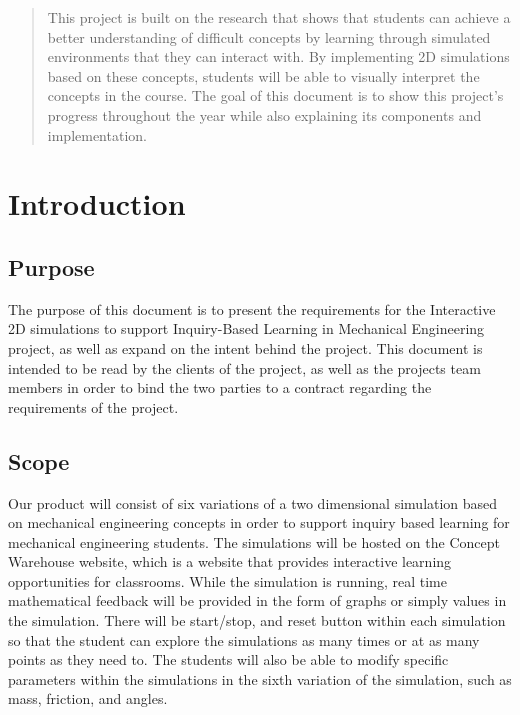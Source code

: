 \begin{titlepage}
\begin{singlespace}
\begin{abstract}
This project is built on the research that shows that students can achieve a better understanding of difficult concepts by learning through simulated environments that they can interact with.
By implementing 2D simulations based on these concepts, students will be able to visually interpret the concepts in the course.
The goal of this document is to show this project's progress throughout the year while also explaining its components and implementation.  
        \end{abstract}     
    \end{singlespace}
\end{titlepage}
\newpage
{}

\clearpage

\section{Introduction}
\subsection{Purpose}
The purpose of this document is to present the requirements for the Interactive 2D simulations to support Inquiry-Based Learning in Mechanical Engineering project, as well as expand on the intent behind the project. This document is intended to be read by the clients of the project, as well as the projects team members in order to bind the two parties to a contract regarding the requirements of the project.
\subsection{Scope}
Our product will consist of six variations of a two dimensional simulation based on mechanical engineering concepts in order to support inquiry based learning for mechanical engineering students. The simulations will be hosted on the Concept Warehouse website, which is a website that provides interactive learning opportunities for classrooms. While the simulation is running, real time mathematical feedback will be provided in the form of graphs or simply values in the simulation. There will be start/stop, and reset button within each simulation so that the student can explore the simulations as many times or at as many points as they need to. The students will also be able to modify specific parameters within the simulations in the sixth variation of the simulation, such as mass, friction, and angles.
